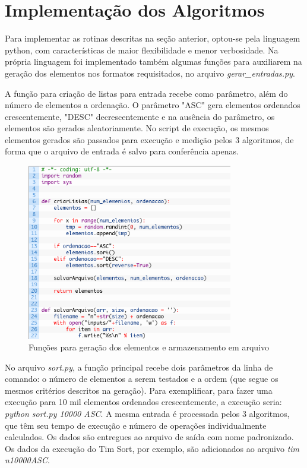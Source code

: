 \chapter{Implementação dos Algoritmos}
Para implementar as rotinas descritas na seção anterior, optou-se pela linguagem python, com características de maior flexibilidade e menor verbosidade. Na própria linguagem foi implementado também algumas funções para auxiliarem na geração dos elementos nos formatos requisitados, no arquivo \textit{gerar\_entradas.py}. 

A função para criação de listas para entrada recebe como parâmetro, além do número de elementos a ordenação. O parâmetro "ASC" gera elementos ordenados crescentemente, "DESC" decrescentemente e na ausência do parâmetro, os elementos são gerados aleatoriamente. No script de execução, os mesmos elementos gerados são passados para execução e medição pelos 3 algoritmos, de forma que o arquivo de entrada é salvo para conferência apenas.

\begin{figure}[!htb]
\centering
\includegraphics[width=9cm]{img/codigo1.png}
\caption{Funções para geração dos elementos e armazenamento em arquivo}
\label{fig:codigo1}
\end{figure}

No arquivo \textit{sort.py}, a função principal recebe dois parâmetros da linha de comando: o número de elementos a serem testados e a ordem (que segue os mesmos critérios descritos na geração). Para exemplificar, para fazer uma execução para 10 mil elementos ordenados crescentemente, a execução seria: \textit{python sort.py 10000 ASC}. A mesma entrada é processada pelos 3 algoritmos, que têm seu tempo de execução e número de operações individualmente calculados. Os dados são entregues ao arquivo de saída com nome padronizado. Os dados da execução do Tim Sort, por exemplo, são adicionados ao arquivo \textit{tim n10000ASC}.


